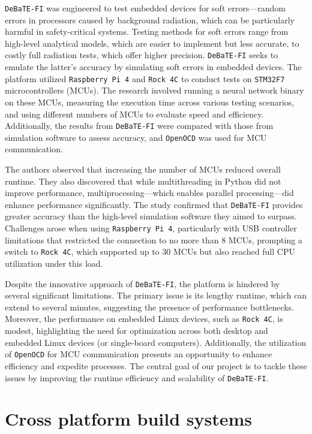 \texttt{DeBaTE-FI} was engineered to test embedded devices for soft errors—random errors in processors caused by background radiation, which can be particularly harmful in safety-critical systems. Testing methods for soft errors range from high-level analytical models, which are easier to implement but less accurate, to costly full radiation tests, which offer higher precision. \texttt{DeBaTE-FI} seeks to emulate the latter's accuracy by simulating soft errors in embedded devices. The platform utilized \texttt{Raspberry Pi 4} and \texttt{Rock 4C} to conduct tests on \texttt{STM32F7} microcontrollers (MCUs). The research involved running a neural network binary on these MCUs, measuring the execution time across various testing scenarios, and using different numbers of MCUs to evaluate speed and efficiency. Additionally, the results from \texttt{DeBaTE-FI} were compared with those from simulation software to assess accuracy, and \texttt{OpenOCD} was used for MCU communication.

The authors observed that increasing the number of MCUs reduced overall runtime. They also discovered that while multithreading in Python did not improve performance, multiprocessing—which enables parallel processing—did enhance performance significantly. The study confirmed that \texttt{DeBaTE-FI} provides greater accuracy than the high-level simulation software they aimed to surpass. Challenges arose when using \texttt{Raspberry Pi 4}, particularly with USB controller limitations that restricted the connection to no more than 8 MCUs, prompting a switch to \texttt{Rock 4C}, which supported up to 30 MCUs but also reached full CPU utilization under this load.

Despite the innovative approach of \texttt{DeBaTE-FI}, the platform is hindered by several significant limitations. The primary issue is its lengthy runtime, which can extend to several minutes, suggesting the presence of performance bottlenecks. Moreover, the performance on embedded Linux devices, such as \texttt{Rock 4C}, is modest, highlighting the need for optimization across both desktop and embedded Linux devices (or single-board computers). Additionally, the utilization of \texttt{OpenOCD} for MCU communication presents an opportunity to enhance efficiency and expedite processes. The central goal of our project is to tackle these issues by improving the runtime efficiency and scalability of \texttt{DeBaTE-FI}.

\section{Cross platform build systems}

